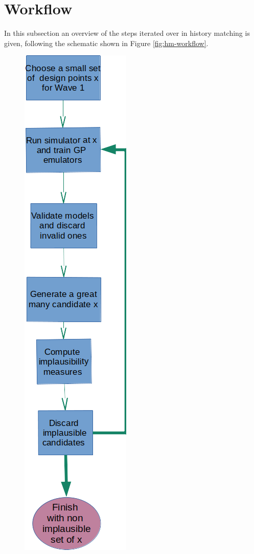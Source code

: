 \documentclass[
  12pt,
  a4paper,
  twoside]{book}
\begin{document}
\hypertarget{workflow}{%
\section{Workflow}\label{workflow}}

In this subsection an overview of the steps iterated over in history matching is given, following the schematic shown in Figure \ref{fig:hm-workflow}.

\begin{figure}[H]

{\centering \includegraphics[width=0.8\linewidth]{figures/hm-workflow-vertical} 

}
\end{figure}
\end{document}
